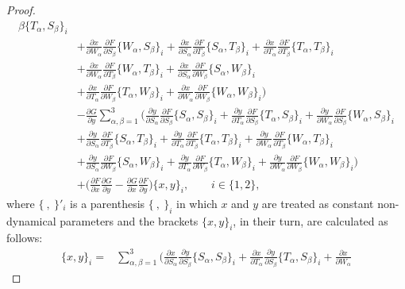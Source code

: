 \documentclass[pdftex]{sigma}
\def\a{\alpha}
\def\b{\beta}
\numberwithin{equation}{section}
\begin{document}
\begin{proof}
\begin{align*}
{{\b}}\{T_{\a},S_{\b}\}_i\\
&+ \frac{\partial x}{\partial W_{ \a}}
\frac{\partial F}{\partial S_{ \b}}\{W_{\a},S_{\b}\}_i+ \frac{\partial x}{\partial S_{ \a}}
\frac{\partial F}{\partial T_{ \b}}\{S_{\a},T_{\b}\}_i+ \frac{\partial x}{\partial T_{ \a}} \frac{\partial F}{\partial T_{ \b}}\{T_{\a},T_{\b}\}_i
\\
&+
 \frac{\partial x}{\partial W_{ \a}}
\frac{\partial F}{\partial T_{ \b}}\{W_{\a},T_{\b}\}_i+ \frac{\partial x}{\partial S_{ \a}}
\frac{\partial F}{\partial W_{ \b}}\{S_{\a},W_{\b}\}_i \\
&+ \frac{\partial x}{\partial T_{ \a}} \frac{\partial F}{\partial
W_{ \b}}\{T_{\a},W_{\b}\}_i
+\frac{\partial x}{\partial W_{ \a}}
\frac{\partial F}{\partial W_{ \b}}\{W_{\a},W_{\b}\}_i \biggr)
\\
& -
 \frac{\partial G}{ \partial y} \sum\limits_{\a,\b=1}^3\biggl( \frac{\partial y}{\partial S_{ \a}}
\frac{\partial F}{\partial S_{ \b}}\{S_{\a},S_{\b}\}_i+
\frac{\partial y}{\partial T_{ \a}} \frac{\partial F}{\partial S_{
\b}}\{T_{\a},S_{\b}\}_i+\frac{\partial y}{\partial W_{ \a}}
\frac{\partial F}{\partial S_{ \b}}\{W_{\a},S_{\b}\}_i
\\
&+ \frac{\partial y}{\partial S_{ \a}}
\frac{\partial F}{\partial T_{ \b}}\{S_{\a},T_{\b}\}_i+ \frac{\partial y}{\partial T_{ \a}} \frac{\partial F}{\partial
T_{ \b}}\{T_{\a},T_{\b}\}_i+\frac{\partial y}{\partial W_{ \a}}
\frac{\partial F}{\partial T_{ \b}}\{W_{\a},T_{\b}\}_i\\
&+ \frac{\partial y}{\partial S_{ \a}}
\frac{\partial F}{\partial W_{ \b}}\{S_{\a},W_{\b}\}_i+ \frac{\partial y}{\partial T_{ \a}} \frac{\partial F}{\partial
W_{ \b}}\{T_{\a},W_{\b}\}_i + \frac{\partial y}{\partial W_{ \a}}
\frac{\partial F}{\partial W_{ \b}}\{W_{\a},W_{\b}\}_i \biggr)\\
&+ \biggl( \frac{\partial F}{ \partial x} \frac{\partial G}{ \partial y}- \frac{\partial G}{ \partial x}\frac{\partial F}{ \partial y} \biggr)\{x,y\}_i, \qquad i\in \{1,2\},
\end{align*}
where $\{ \ , \ \}'_i$ is a parenthesis $\{\ , \ \}_i$ in which $x$ and $y$ are treated as constant non-dynamical parameters
and the brackets $\{x,y\}_i$, in their turn, are calculated as follows:
\begin{align*}%
\{ x, y \}_i={}&
\sum\limits_{\a,\b=1}^3\biggl( \frac{\partial x}{\partial S_{ \a}}
\frac{\partial y}{\partial S_{ \b}}\{S_{\a},S_{\b}\}_i+
\frac{\partial x}{\partial T_{ \a}} \frac{\partial y}{\partial S_{
\b}}\{T_{\a},S_{\b}\}_i+ \frac{\partial x}{\partial W_{ \a}}

\end{align*}
\end{proof}
\end{document}
